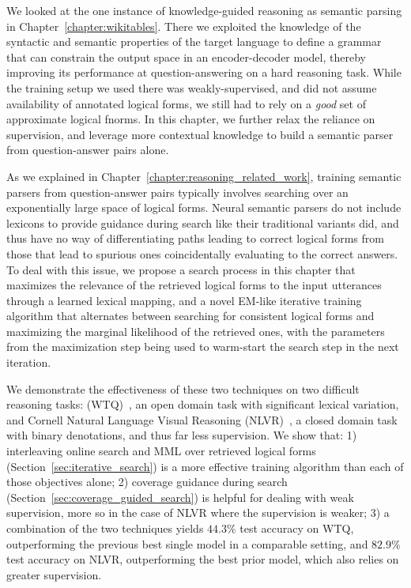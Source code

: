 We looked at the one instance of knowledge-guided reasoning as semantic parsing in
Chapter~\ref{chapter:wikitables}. There we exploited the knowledge of the syntactic
and semantic properties of the target language to define a grammar that can
constrain the output space in an encoder-decoder model, thereby improving its
performance at question-answering on a hard reasoning task. While the training setup we
used there was weakly-supervised, and did not assume availability of annotated
logical forms, we still had to rely on a \emph{good} set of approximate
logical fnorms. In this chapter, we further relax the reliance on supervision,
and leverage more contextual knowledge to build a semantic parser from
question-answer pairs alone.

As we explained in Chapter~\ref{chapter:reasoning_related_work},  training
semantic parsers from question-answer pairs typically involves
searching over an exponentially large space of logical forms. Neural semantic
parsers do not include lexicons to provide guidance during search like their
traditional variants did, and thus have no way of differentiating paths leading
to correct logical forms from those that lead to spurious ones coincidentally
evaluating to the correct answers. To deal with this issue, we propose a search
process in this chapter that maximizes the relevance of the retrieved logical forms to the input
utterances through a learned lexical mapping, and a novel EM-like iterative
training algorithm that alternates between searching for consistent logical
forms and maximizing the marginal likelihood of the retrieved ones, with the
parameters from the maximization step being used to warm-start the search step
in the next iteration.

We demonstrate the effectiveness of these two techniques on two difficult
reasoning tasks: \WTQ{}(WTQ)~\citep{pasupat2015compositional}, an open domain
task with significant lexical variation, and Cornell Natural Language Visual
Reasoning (NLVR)~\citep{suhr2017corpus}, a closed domain task with binary
denotations, and thus far less supervision. We show that: 1) interleaving
online search and MML over retrieved logical forms
(Section~\ref{sec:iterative_search}) is a more effective training algorithm than each
of those objectives alone; 2) coverage guidance during search
(Section~\ref{sec:coverage_guided_search}) is helpful for dealing with weak
supervision, more so in the case of NLVR where the supervision is weaker; 3) a
combination of the two techniques yields $44.3\%$ test accuracy on WTQ,
outperforming the previous best single model in a comparable setting, and
$82.9\%$ test accuracy on NLVR, outperforming the best prior model, which also
relies on greater supervision.

